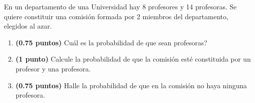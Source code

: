 
En un departamento de una Universidad hay 8 profesores y 14 profesoras. Se quiere constituir una comisión formada por 2 miembros del departamento, elegidos al azar.
\begin{enumerate}[label=\alph*)]
\item \textbf{(0.75 puntos)} \textquestiondown{}Cuál es la probabilidad de que sean profesoras?
\item \textbf{(1 punto)} Calcule la probabilidad de que la comisión esté constituida por un profesor y una profesora.
\item \textbf{(0.75 puntos)} Halle la probabilidad de que en la comisión no haya ninguna profesora.
\end{enumerate}
